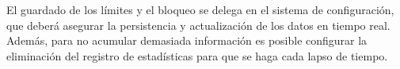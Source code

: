 El guardado de los límites y el bloqueo se delega en el sistema de configuración, que deberá asegurar la persistencia y actualización de los datos en tiempo real. Además, para no acumular demasiada información es posible configurar la eliminación del registro de estadísticas para que se haga cada lapso de tiempo. 